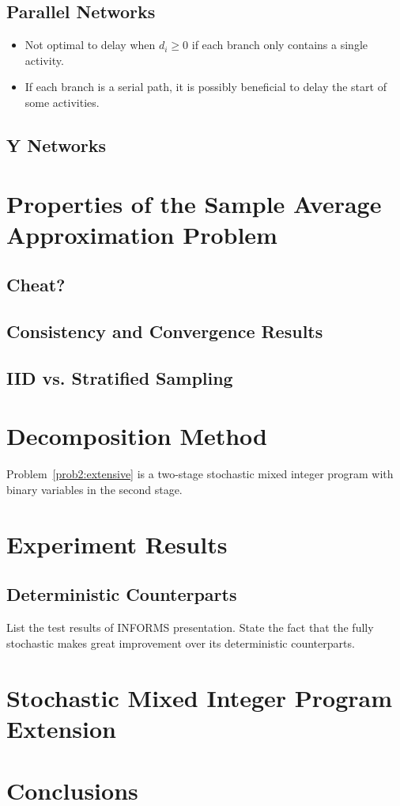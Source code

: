 \documentclass[11pt]{article}
\begin{document}
	\subsection{Parallel Networks}
		\begin{itemize}
			\item Not optimal to delay when \(d_i \geq 0\) if each branch only contains a single activity.
			\item If each branch is a serial path, it is possibly beneficial to delay the start of some activities.
		\end{itemize}
	\subsection{Y Networks}
\section{Properties of the Sample Average Approximation Problem} \label{sec:consistency}
	\subsection{Cheat?}
	\subsection{Consistency and Convergence Results}
	\subsection{IID vs. Stratified Sampling}
\section{Decomposition Method} \label{sec:decomposition}
	Problem~\eqref{prob2:extensive} is a two-stage stochastic mixed integer program with binary variables in the second stage. 
\section{Experiment Results} \label{sec:results}
	\subsection{Deterministic Counterparts}
		List the test results of INFORMS presentation. State the fact that the fully stochastic makes great improvement over its deterministic counterparts.
\section{Stochastic Mixed Integer Program Extension}
\section{Conclusions} \label{sec:conclusions}



\end{document}
